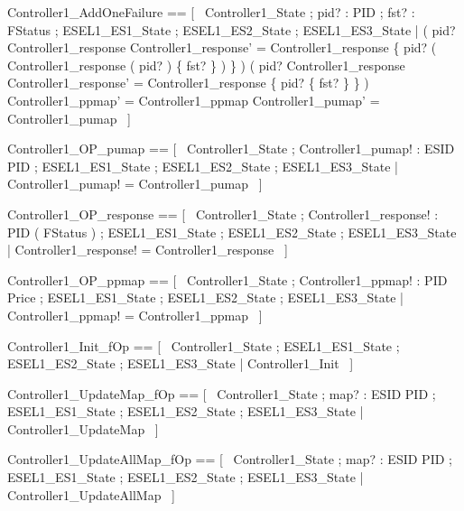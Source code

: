 \documentclass{article}
\begin{document}
\begin{zed}
	Controller1\_AddOneFailure == [~  \Delta Controller1\_State ; pid? : PID ; fst? : FStatus ; \Xi ESEL1\_ES1\_State ; \Xi ESEL1\_ES2\_State ; \Xi ESEL1\_ES3\_State | ( pid? \in \dom Controller1\_response \implies Controller1\_response' = Controller1\_response \oplus \{ pid? \mapsto ( Controller1\_response ( pid? ) \cup \{ fst? \} ) \} ) \land ( pid? \notin \dom Controller1\_response \implies Controller1\_response' = Controller1\_response \cup \{ pid? \mapsto \{ fst? \} \} ) \land Controller1\_ppmap' = Controller1\_ppmap \land Controller1\_pumap' = Controller1\_pumap  ~]
\end{zed}

\begin{zed}
	Controller1\_OP\_pumap == [~  \Xi Controller1\_State ; Controller1\_pumap! : ESID \pfun PID ; \Xi ESEL1\_ES1\_State ; \Xi ESEL1\_ES2\_State ; \Xi ESEL1\_ES3\_State | Controller1\_pumap! = Controller1\_pumap  ~]
\end{zed}

\begin{zed}
	Controller1\_OP\_response == [~  \Xi Controller1\_State ; Controller1\_response! : PID \pfun ( \power FStatus ) ; \Xi ESEL1\_ES1\_State ; \Xi ESEL1\_ES2\_State ; \Xi ESEL1\_ES3\_State | Controller1\_response! = Controller1\_response  ~]
\end{zed}

\begin{zed}
	Controller1\_OP\_ppmap == [~  \Xi Controller1\_State ; Controller1\_ppmap! : PID \pfun Price ; \Xi ESEL1\_ES1\_State ; \Xi ESEL1\_ES2\_State ; \Xi ESEL1\_ES3\_State | Controller1\_ppmap! = Controller1\_ppmap  ~]
\end{zed}

\begin{zed}
	Controller1\_Init\_fOp == [~  \Xi Controller1\_State ; \Xi ESEL1\_ES1\_State ; \Xi ESEL1\_ES2\_State ; \Xi ESEL1\_ES3\_State | \lnot \pre Controller1\_Init  ~]
\end{zed}

\begin{zed}
	Controller1\_UpdateMap\_fOp == [~  \Xi Controller1\_State ; map? : ESID \pfun PID ; \Xi ESEL1\_ES1\_State ; \Xi ESEL1\_ES2\_State ; \Xi ESEL1\_ES3\_State | \lnot \pre Controller1\_UpdateMap  ~]
\end{zed}

\begin{zed}
	Controller1\_UpdateAllMap\_fOp == [~  \Xi Controller1\_State ; map? : ESID \pfun PID ; \Xi ESEL1\_ES1\_State ; \Xi ESEL1\_ES2\_State ; \Xi ESEL1\_ES3\_State | \lnot \pre Controller1\_UpdateAllMap  ~]
\end{zed}
\end{document}
